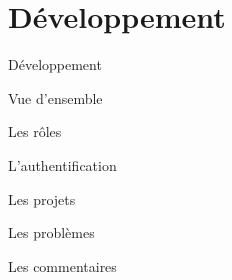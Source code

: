 \section{Développement}

\begin{frame}{Développement}  
\end{frame}

\begin{frame}{Vue d'ensemble}
\end{frame}

\begin{frame}{Les rôles}  
\end{frame}

\begin{frame}{L'authentification}  
\end{frame}

\begin{frame}{Les projets}  
\end{frame}

\begin{frame}{Les problèmes}
\end{frame}

\begin{frame}{Les commentaires}
\end{frame}

